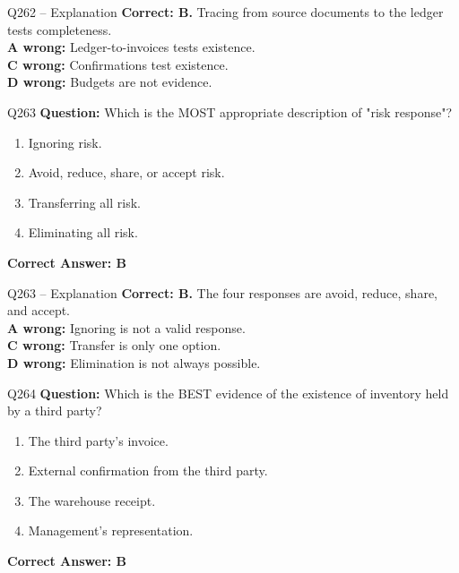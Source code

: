 \documentclass[aspectratio=169,10pt]{beamer}
\begin{document}
	\begin{frame}[t]{Q262 -- Explanation}
		\small
		\textbf{Correct: B.} Tracing from source documents to the ledger tests completeness. \\[4pt]
		\textbf{A wrong:} Ledger-to-invoices tests existence. \\[2pt]
		\textbf{C wrong:} Confirmations test existence. \\[2pt]
		\textbf{D wrong:} Budgets are not evidence.
	\end{frame}
	
	\begin{frame}[t]{Q263}
		\small
		\textbf{Question:} Which is the MOST appropriate description of "risk response"?
		\begin{enumerate}[label=\Alph*.,itemsep=1pt,topsep=2pt]
			\item Ignoring risk.
			\item Avoid, reduce, share, or accept risk.
			\item Transferring all risk.
			\item Eliminating all risk.
		\end{enumerate}
		\vspace{4pt}
		\textbf{Correct Answer: B}
	\end{frame}
	
	\begin{frame}[t]{Q263 -- Explanation}
		\small
		\textbf{Correct: B.} The four responses are avoid, reduce, share, and accept. \\[4pt]
		\textbf{A wrong:} Ignoring is not a valid response. \\[2pt]
		\textbf{C wrong:} Transfer is only one option. \\[2pt]
		\textbf{D wrong:} Elimination is not always possible.
	\end{frame}
	
	\begin{frame}[t]{Q264}
		\small
		\textbf{Question:} Which is the BEST evidence of the existence of inventory held by a third party?
		\begin{enumerate}[label=\Alph*.,itemsep=1pt,topsep=2pt]
			\item The third party's invoice.
			\item External confirmation from the third party.
			\item The warehouse receipt.
			\item Management's representation.
		\end{enumerate}
		\vspace{4pt}
		\textbf{Correct Answer: B}
	\end{frame}
	
\end{document}
